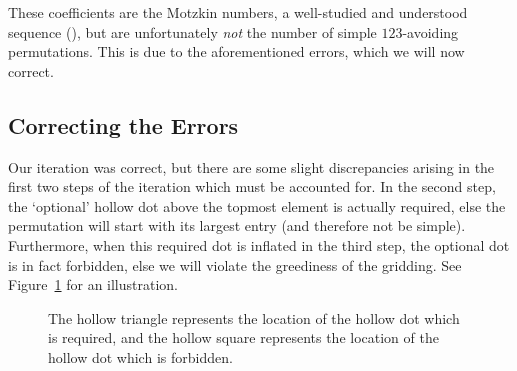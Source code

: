     These coefficients are the Motzkin numbers, a well-studied and understood
    sequence (), but are unfortunately \emph{not} the number of
    simple $123$-avoiding permutations.  This is due to the aforementioned
    errors, which we will now correct. 
    
    
  \subsection{Correcting the Errors}
  \label{involutions:sub:errors}

    Our iteration was correct, but there are some slight discrepancies arising
    in the first two steps of the iteration which must be accounted for. In the
    second step, the `optional' hollow dot above the topmost element is
    actually required, else the permutation will start with its largest entry
    (and therefore not be simple). Furthermore, when this required dot is
    inflated in the third step, the optional dot is in fact forbidden, else we
    will violate the greediness of the gridding. See
    Figure~\ref{involutions:fig:errors} for an illustration. 
    
    

    \begin{figure}[t] \centering
        \hspace{2pc} 
      \caption[The hollow triangle represents the location of the hollow dot
                which is required]{
          The hollow triangle represents the location of the hollow dot
          which is required, and the hollow square represents the location of
          the hollow dot which is forbidden.}
    \label{involutions:fig:errors}
    \end{figure}
  
